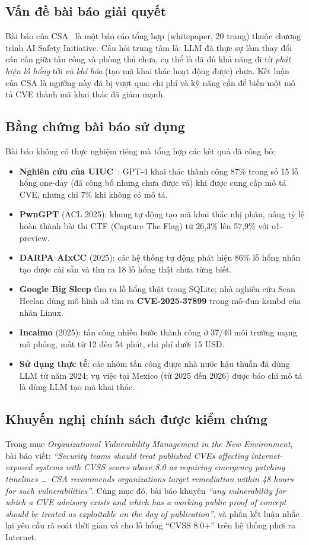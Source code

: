 \documentclass[conference]{IEEEtran}
\begin{document}
\subsection{Vấn đề bài báo giải quyết}
Bài báo của CSA~\cite{csa2026} là một báo cáo tổng hợp (whitepaper, 20 trang) thuộc chương trình
AI Safety Initiative. Câu hỏi trung tâm là: LLM đã thực sự làm thay đổi cán cân giữa tấn công và phòng thủ chưa, cụ thể là đã đủ khả năng đi từ \emph{phát hiện lỗ hổng} tới \emph{vũ khí hóa}
(tạo mã khai thác hoạt động được) chưa. Kết luận của CSA là ngưỡng này đã bị vượt qua: chi phí và
kỹ năng cần để biến một mô tả CVE thành mã khai thác đã giảm mạnh.

\subsection{Bằng chứng bài báo sử dụng}
Bài báo không có thực nghiệm riêng mà tổng hợp các kết quả đã công bố:
\begin{itemize}
\item \textbf{Nghiên cứu của UIUC}~\cite{fang2024}: GPT-4 khai thác thành công 87\% trong số 15 lỗ hổng one-day (đã công bố nhưng chưa được vá) khi được cung cấp mô tả CVE, nhưng chỉ 7\% khi không có mô tả.
\item \textbf{PwnGPT} (ACL 2025): khung tự động tạo mã khai thác nhị phân, nâng tỷ lệ hoàn thành bài thi CTF (Capture The Flag) từ 26,3\% lên 57,9\% với o1-preview.
\item \textbf{DARPA AIxCC} (2025): các hệ thống tự động phát hiện 86\% lỗ hổng nhân tạo được cài sẵn và tìm
ra 18 lỗ hổng thật chưa từng biết.
\item \textbf{Google Big Sleep} tìm ra lỗ hổng thật trong SQLite; nhà nghiên cứu Sean Heelan dùng
mô hình o3 tìm ra \textbf{CVE-2025-37899} trong mô-đun ksmbd của nhân Linux.
\item \textbf{Incalmo} (2025): tấn công nhiều bước thành công ở 37/40 môi trường mạng mô phỏng, mất từ 12 đến 54 phút, chi phí dưới 15 USD.
\item \textbf{Sử dụng thực tế}: các nhóm tấn công được nhà nước hậu thuẫn đã dùng LLM từ năm 2024; vụ việc tại Mexico
(từ 2025 đến 2026) được báo chí mô tả là dùng LLM tạo mã khai thác.
\end{itemize}

\subsection{Khuyến nghị chính sách được kiểm chứng}
Trong mục \emph{Organizational Vulnerability Management in the New Environment}, bài báo viết:
\emph{``Security teams should treat published CVEs affecting internet-exposed systems with CVSS
scores above 8.0 as requiring emergency patching timelines \ldots\ CSA recommends organizations
target remediation within 48 hours for such vulnerabilities''}. Cùng mục đó, bài báo khuyên
\emph{``any vulnerability for which a CVE advisory exists and which has a working public proof of
concept should be treated as exploitable on the day of publication''}, và phần kết luận nhắc lại
yêu cầu rà soát thời gian vá cho lỗ hổng ``CVSS 8.0+'' trên hệ thống phơi ra Internet.
\end{document}
